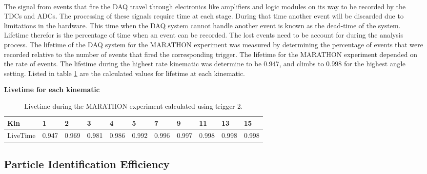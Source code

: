 \paragraph{}The signal from events that fire the DAQ travel through electronics like amplifiers and logic modules on its way to be recorded by the TDCs and ADCs. The processing of these signals require time at each stage. During that time another event will be discarded due to limitations in the hardware. This time when the DAQ system cannot handle another event is known as the dead-time of the system. Lifetime therefor is the percentage of time when an event can be recorded. The lost events need to be account for during the analysis process. The lifetime of the DAQ system for the MARATHON experiment was measured by determining the percentage of events that were recorded relative to the number of events that fired the corresponding trigger. The lifetime for the MARATHON experiment depended on the rate of events. The lifetime during the highest rate kinematic was determine to be 0.947, and climbs to 0.998 for the highest angle setting. Listed in table \ref{LTtable} are the calculated values for lifetime at each kinematic. 

\begin{table}[]
	\textbf{Livetime for each kinematic }\par\medskip
	\begin{tabular}{|l|l|l|l|l|l|l|l|l|l|l|}
		\hline
		Kin      & 1 & 2 & 3 & 4 & 5 & 7 & 9 & 11 & 13 & 15 \\ \hline
		LiveTime & 0.947 & 0.969 & 0.981 & 0.986 & 0.992 & 0.996 & 0.997 & 0.998  & 0.998  & 0.998\\ \hline
	\end{tabular}
	\caption{Livetime during the MARATHON experiment calculated using trigger 2.  }
	\label{LTtable}
\end{table}
  

\subsection{Particle Identification Efficiency}

